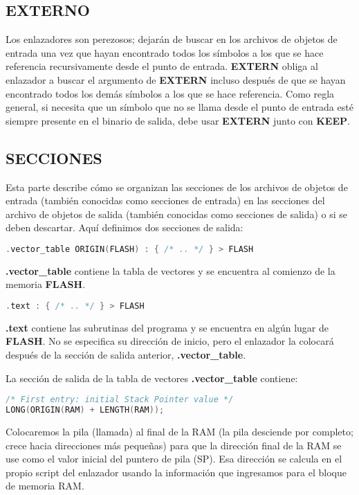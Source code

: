 \subsection{EXTERNO}
Los enlazadores son perezosos; dejarán de buscar en los archivos de objetos de entrada una vez que hayan encontrado todos los símbolos a los que se hace referencia recursivamente desde el punto de entrada. \textbf{EXTERN} obliga al enlazador a buscar el argumento de \textbf{EXTERN} incluso después de que se hayan encontrado todos los demás símbolos a los que se hace referencia. Como regla general, si necesita que un símbolo que no se llama desde el punto de entrada esté siempre presente en el binario de salida, debe usar \textbf{EXTERN} junto con \textbf{KEEP}.

\subsection{SECCIONES}
Esta parte describe cómo se organizan las secciones de los archivos de objetos de entrada (también conocidas como secciones de entrada) en las secciones del archivo de objetos de salida (también conocidas como secciones de salida) o si se deben descartar. Aquí definimos dos secciones de salida:

\begin{lstlisting}[language=c]
.vector_table ORIGIN(FLASH) : { /* .. */ } > FLASH
\end{lstlisting}


\textbf{.vector\_table} contiene la tabla de vectores y se encuentra al comienzo de la memoria \textbf{FLASH}.


\begin{lstlisting}[language=c]
.text : { /* .. */ } > FLASH	
\end{lstlisting}

\textbf{.text} contiene las subrutinas del programa y se encuentra en algún lugar de \textbf{FLASH}. No se especifica su dirección de inicio, pero el enlazador la colocará después de la sección de salida anterior, \textbf{.vector\_table}.

La sección de salida de la tabla de vectores \textbf{.vector\_table} contiene:

\begin{lstlisting}[language=c]
/* First entry: initial Stack Pointer value */
LONG(ORIGIN(RAM) + LENGTH(RAM));
\end{lstlisting}

Colocaremos la pila (llamada) al final de la RAM (la pila desciende por completo; crece hacia direcciones más pequeñas) para que la dirección final de la RAM se use como el valor inicial del puntero de pila (SP). Esa dirección se calcula en el propio script del enlazador usando la información que ingresamos para el bloque de memoria RAM.


